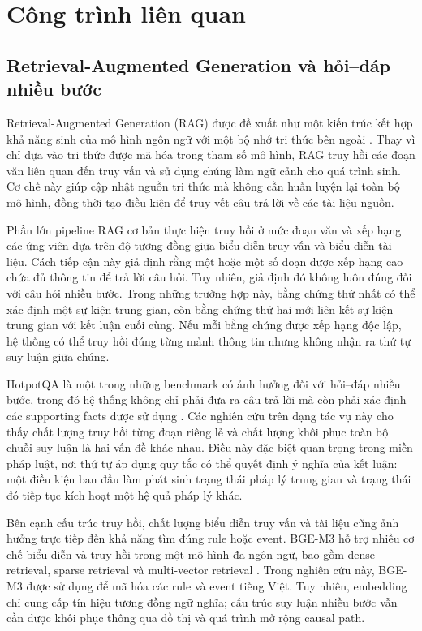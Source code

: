 \section{Công trình liên quan}
\label{sec:related-work}

\subsection{Retrieval-Augmented Generation và hỏi--đáp nhiều bước}

Retrieval-Augmented Generation (RAG) được đề xuất như một kiến trúc kết hợp
khả năng sinh của mô hình ngôn ngữ với một bộ nhớ tri thức bên ngoài
\cite{lewis2020rag}. Thay vì chỉ dựa vào tri thức được mã hóa trong tham số
mô hình, RAG truy hồi các đoạn văn liên quan đến truy vấn và sử dụng chúng
làm ngữ cảnh cho quá trình sinh. Cơ chế này giúp cập nhật nguồn tri thức mà
không cần huấn luyện lại toàn bộ mô hình, đồng thời tạo điều kiện để truy
vết câu trả lời về các tài liệu nguồn.

Phần lớn pipeline RAG cơ bản thực hiện truy hồi ở mức đoạn văn và xếp hạng
các ứng viên dựa trên độ tương đồng giữa biểu diễn truy vấn và biểu diễn tài
liệu. Cách tiếp cận này giả định rằng một hoặc một số đoạn được xếp hạng cao
chứa đủ thông tin để trả lời câu hỏi. Tuy nhiên, giả định đó không luôn đúng
đối với câu hỏi nhiều bước. Trong những trường hợp này, bằng chứng thứ nhất
có thể xác định một sự kiện trung gian, còn bằng chứng thứ hai mới liên kết
sự kiện trung gian với kết luận cuối cùng. Nếu mỗi bằng chứng được xếp hạng
độc lập, hệ thống có thể truy hồi đúng từng mảnh thông tin nhưng không nhận
ra thứ tự suy luận giữa chúng.

HotpotQA là một trong những benchmark có ảnh hưởng đối với hỏi--đáp nhiều
bước, trong đó hệ thống không chỉ phải đưa ra câu trả lời mà còn phải xác
định các supporting facts được sử dụng
\cite{yang2018hotpotqa}. Các nghiên cứu trên dạng tác vụ này cho thấy chất
lượng truy hồi từng đoạn riêng lẻ và chất lượng khôi phục toàn bộ chuỗi suy
luận là hai vấn đề khác nhau. Điều này đặc biệt quan trọng trong miền pháp
luật, nơi thứ tự áp dụng quy tắc có thể quyết định ý nghĩa của kết luận:
một điều kiện ban đầu làm phát sinh trạng thái pháp lý trung gian và trạng
thái đó tiếp tục kích hoạt một hệ quả pháp lý khác.

Bên cạnh cấu trúc truy hồi, chất lượng biểu diễn truy vấn và tài liệu cũng
ảnh hưởng trực tiếp đến khả năng tìm đúng rule hoặc event. BGE-M3 hỗ trợ
nhiều cơ chế biểu diễn và truy hồi trong một mô hình đa ngôn ngữ, bao gồm
dense retrieval, sparse retrieval và multi-vector retrieval
\cite{chen2024bgem3}. Trong nghiên cứu này, BGE-M3 được sử dụng để mã hóa
các rule và event tiếng Việt. Tuy nhiên, embedding chỉ cung cấp tín hiệu
tương đồng ngữ nghĩa; cấu trúc suy luận nhiều bước vẫn cần được khôi phục
thông qua đồ thị và quá trình mở rộng causal path.

